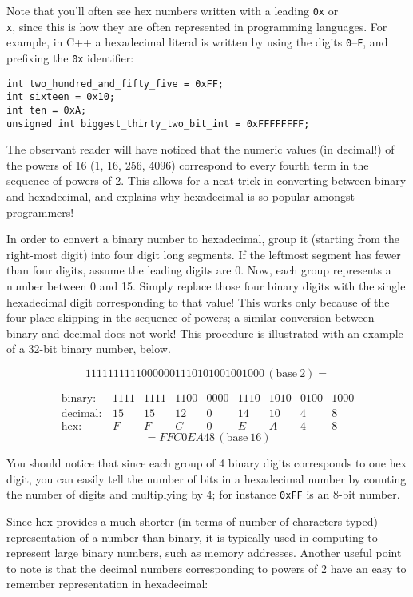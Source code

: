 \documentclass[a4paper]{scrartcl}
\newcommand{\binary}{\ensuremath{\,(\mathrm{base}~2)}}
\newcommand{\hex}{\ensuremath{\,(\mathrm{base}~16)}}
\begin{document}
Note that you'll often see hex numbers written with a leading \texttt{0x} or \texttt{\\x}, since this is how they are often represented in programming languages. For example, in C++ a hexadecimal literal is written by using the digits \texttt{0}--\texttt{F}, and prefixing the \texttt{0x} identifier:

\begin{verbatim}
int two_hundred_and_fifty_five = 0xFF;
int sixteen = 0x10;
int ten = 0xA;
unsigned int biggest_thirty_two_bit_int = 0xFFFFFFFF;
\end{verbatim}

The observant reader will have noticed that the numeric values (in decimal!) of the powers of 16 (1, 16, 256, 4096) correspond to every fourth term in the sequence of powers of 2. This allows for a neat trick in converting between binary and hexadecimal, and explains why hexadecimal is so popular amongst programmers!

In order to convert a binary number to hexadecimal, group it (starting from the right-most digit) into four digit long segments. If the leftmost segment has fewer than four digits, assume the leading digits are 0. Now, each group represents a number between 0 and 15. Simply replace those four binary digits with the single hexadecimal digit corresponding to that value! This works only because of the four-place skipping in the sequence of powers; a similar conversion between binary and decimal does not work! This procedure is illustrated with an example of a 32-bit binary number, below.

\[ 11111111110000001110101001001000\binary = \]

\[\begin{array}{lcccccccc}
\mathrm{binary:}  &1111 & 1111 & 1100 & 0000 & 1110 & 1010 & 0100 & 1000\\
\mathrm{decimal:} &15   & 15   & 12   & 0    & 14   & 10   & 4    & 8   \\
\mathrm{hex:}     &F    & F    & C    & 0    & E    & A    & 4    & 8
\end{array}\]
\[ = FFC0EA48 \hex \]

You should notice that since each group of 4 binary digits corresponds to one hex digit, you can easily tell the number of bits in a hexadecimal number by counting the number of digits and multiplying by 4; for instance \texttt{0xFF} is an 8-bit number.

Since hex provides a much shorter (in terms of number of characters typed) representation of a number than binary, it is typically used in computing to represent large binary numbers, such as memory addresses. Another useful point to note is that the decimal numbers corresponding to powers of 2 have an easy to remember representation in hexadecimal:
\end{document}
